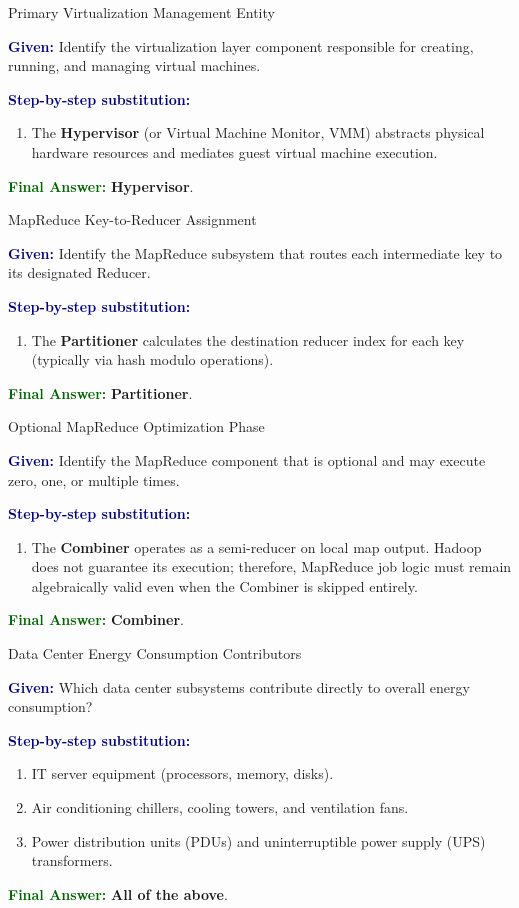 \documentclass[11pt,a4paper,openany]{report}
\newcommand{\Given}{\par\textbf{\textcolor{navy}{Given:}} }
\newcommand{\Steps}{\par\textbf{\textcolor{navy}{Step-by-step substitution:}}\par}
\newcommand{\Answer}{\par\textbf{\textcolor{darkgreen}{Final Answer:}} }
\begin{document}
\begin{solved}{Primary Virtualization Management Entity}
\Given Identify the virtualization layer component responsible for creating, running, and managing virtual machines.
\Steps
\begin{enumerate}[leftmargin=*]
  \item The \textbf{Hypervisor} (or Virtual Machine Monitor, VMM) abstracts physical hardware resources and mediates guest virtual machine execution.
\end{enumerate}
\Answer \textbf{Hypervisor}.
\end{solved}

\begin{solved}{MapReduce Key-to-Reducer Assignment}
\Given Identify the MapReduce subsystem that routes each intermediate key to its designated Reducer.
\Steps
\begin{enumerate}[leftmargin=*]
  \item The \textbf{Partitioner} calculates the destination reducer index for each key (typically via hash modulo operations).
\end{enumerate}
\Answer \textbf{Partitioner}.
\end{solved}

\begin{solved}{Optional MapReduce Optimization Phase}
\Given Identify the MapReduce component that is optional and may execute zero, one, or multiple times.
\Steps
\begin{enumerate}[leftmargin=*]
  \item The \textbf{Combiner} operates as a semi-reducer on local map output. Hadoop does not guarantee its execution; therefore, MapReduce job logic must remain algebraically valid even when the Combiner is skipped entirely.
\end{enumerate}
\Answer \textbf{Combiner}.
\end{solved}

\begin{solved}{Data Center Energy Consumption Contributors}
\Given Which data center subsystems contribute directly to overall energy consumption?
\Steps
\begin{enumerate}[leftmargin=*]
  \item IT server equipment (processors, memory, disks).
  \item Air conditioning chillers, cooling towers, and ventilation fans.
  \item Power distribution units (PDUs) and uninterruptible power supply (UPS) transformers.
\end{enumerate}
\Answer \textbf{All of the above}.
\end{solved}
\end{document}
